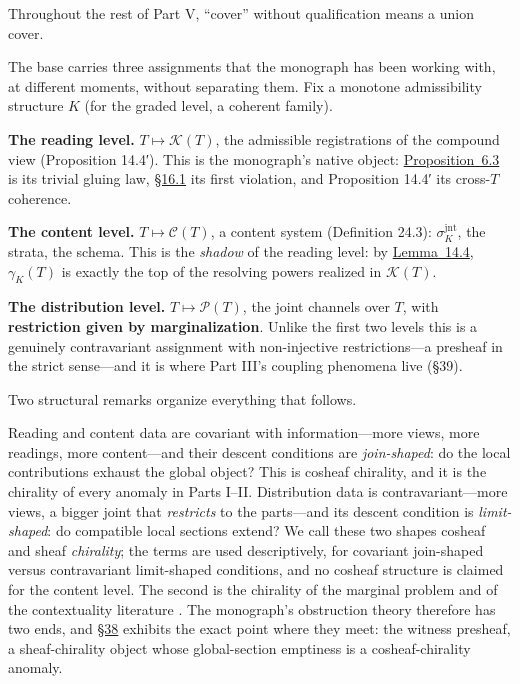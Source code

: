Throughout the rest of Part V, ``cover'' without qualification means a union cover.


The base carries three assignments that the monograph has been working with, at different moments, without separating them. Fix a monotone admissibility structure \(K\) (for the graded level, a coherent family).

\textbf{The reading level.} \(T \mapsto \mathcal{K}(T)\), the admissible registrations of the compound view (Proposition 14.4′). This is the monograph's native object: \hyperlink{stmt:6.3}{Proposition~6.3} is its trivial gluing law, \hyperlink{sec:16.1}{§16.1} its first violation, and Proposition 14.4′ its cross-\(T\) coherence.

\textbf{The content level.} \(T \mapsto \mathcal{C}(T)\), a content system (Definition 24.3): \(\sigma^{\mathrm{jnt}}_K\), the strata, the schema. This is the \emph{shadow} of the reading level: by \hyperlink{stmt:14.4}{Lemma~14.4}, \(\gamma_K(T)\) is exactly the top of the resolving powers realized in \(\mathcal{K}(T)\).

\textbf{The distribution level.} \(T \mapsto \mathcal{P}(T)\), the joint channels over \(T\), with \textbf{restriction given by marginalization}. Unlike the first two levels this is a genuinely contravariant assignment with non-injective restrictions---\hspace{0pt}a presheaf in the strict sense---\hspace{0pt}and it is where Part III's coupling phenomena live (§39).

Two structural remarks organize everything that follows.

\begin{thmrem}

Reading and content data are covariant with information---\hspace{0pt}more views, more readings, more content---\hspace{0pt}and their descent conditions are \emph{join-shaped}: do the local contributions exhaust the global object? This is cosheaf chirality, and it is the chirality of every anomaly in Parts I--II. Distribution data is contravariant---\hspace{0pt}more views, a bigger joint that \emph{restricts} to the parts---\hspace{0pt}and its descent condition is \emph{limit-shaped}: do compatible local sections extend? We call these two shapes cosheaf and sheaf \emph{chirality}; the terms are used descriptively, for covariant join-shaped versus contravariant limit-shaped conditions, and no cosheaf structure is claimed for the content level. The second is the chirality of the marginal problem and of the contextuality literature \autocite{abramsky2011}. The monograph's obstruction theory therefore has two ends, and \hyperlink{sec:38}{§38} exhibits the exact point where they meet: the witness presheaf, a sheaf-chirality object whose global-section emptiness is a cosheaf-chirality anomaly.
\end{thmrem}

